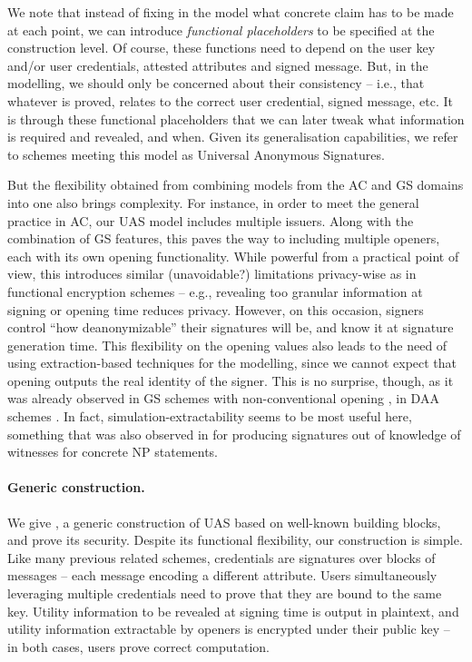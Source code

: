 We note that instead of fixing in the model what concrete claim has to
be made at each point, we can introduce \emph{functional placeholders} to be
specified at the construction level. Of course, these functions need
to depend on the user key and/or user credentials, attested attributes and
signed message. But, in the modelling, we should only be concerned about their
consistency -- i.e., that whatever is proved, relates to the correct user
credential, signed message, etc.
%
It is through these functional placeholders that we can later tweak what
information is required and revealed, and when. Given its generalisation
capabilities, we refer to schemes meeting this model as Universal Anonymous
Signatures.

But the flexibility obtained from combining models from the AC and GS
domains into one also brings complexity. For instance, in order to meet
the general practice in AC, our UAS model includes multiple issuers. Along with
the combination of GS features, this paves the way to including multiple
openers, each with its own opening functionality. While powerful from a
practical point of view, this introduces similar (unavoidable?) limitations
privacy-wise as in functional encryption schemes \cite{bsw11} -- e.g., revealing
too granular information at signing or opening time reduces privacy. However, on
this occasion, signers control ``how deanonymizable'' their signatures will
be, and know it at signature generation time. This flexibility on the opening
values also leads to the need of using extraction-based techniques for the
modelling, since we cannot expect that opening outputs the real identity of the
signer. This is no surprise, though, as it was already observed in GS schemes
with non-conventional opening \cite{dl21}, in DAA schemes \cite{cdl16,cdl16b}.
In fact, simulation-extractability seems to be most useful here, something that
was also observed in \cite{cl06} for producing signatures out of knowledge of
witnesses for concrete NP statements.

\paragraph{Generic construction.} %
We give \CUASGen, a generic construction of UAS based on well-known
building blocks, and prove its security. Despite its functional flexibility, our
construction is simple. Like many previous related schemes, credentials are
signatures over blocks of messages -- each message encoding a different
attribute. Users simultaneously leveraging multiple credentials need to prove
that they are bound to the same key. Utility information to be revealed at
signing time is output in plaintext, and utility information extractable by
openers is encrypted under their public key -- in both cases, users prove
correct computation.


